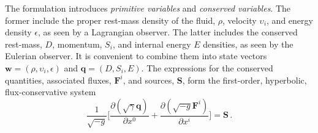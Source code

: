 %
The formulation introduces \textit{primitive variables} and \textit{conserved variables}. 
The former include the proper rest-mass density of the fluid, $\rho$, 
velocity $\upsilon_i$, and energy density $\epsilon$, as seen by a Lagrangian observer. 
The latter includes 
the conserved rest-mass, $D$, momentum, $S_i$, and internal energy $E$
densities, as seen by the Eulerian observer.
%
It is convenient to combine them into state vectors 
$\boldsymbol{w}=(\rho,\upsilon_i,\epsilon)$ and $\boldsymbol{q}=(D,S_i,E)$.
The expressions for the conserved quantities, associated fluxes, $\boldsymbol{F}^i$,  
and sources, $\boldsymbol{S}$, form the first-order, hyperbolic, flux-conservative system  
\begin{equation}
\frac{1}{\sqrt{-g}}\Big[\frac{\partial(\sqrt{\gamma}\boldsymbol{q})}{\partial x^0} + \frac{\partial(\sqrt{-g}\boldsymbol{F}^{i})}{\partial x^i}\Big] = \boldsymbol{S}\, .
\label{eq:theory:valencia} %
\end{equation}
